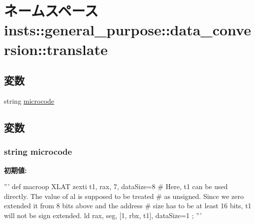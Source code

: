 \hypertarget{namespaceinsts_1_1general__purpose_1_1data__conversion_1_1translate}{
\section{ネームスペース insts::general\_\-purpose::data\_\-conversion::translate}
\label{namespaceinsts_1_1general__purpose_1_1data__conversion_1_1translate}
}
\subsection*{変数}
\begin{DoxyCompactItemize}
\item 
string \hyperlink{namespaceinsts_1_1general__purpose_1_1data__conversion_1_1translate_a770f11a173e99389a8802f0107ed8f52}{microcode}
\end{DoxyCompactItemize}


\subsection{変数}
\hypertarget{namespaceinsts_1_1general__purpose_1_1data__conversion_1_1translate_a770f11a173e99389a8802f0107ed8f52}{
\subsubsection[{microcode}]{\setlength{\rightskip}{0pt plus 5cm}string {\bf microcode}}}
\label{namespaceinsts_1_1general__purpose_1_1data__conversion_1_1translate_a770f11a173e99389a8802f0107ed8f52}
{\bfseries 初期値:}
\begin{DoxyCode}
'''
def macroop XLAT {
    zexti t1, rax, 7, dataSize=8
    # Here, t1 can be used directly. The value of al is supposed to be treated
    # as unsigned. Since we zero extended it from 8 bits above and the address
    # size has to be at least 16 bits, t1 will not be sign extended.
    ld rax, seg, [1, rbx, t1], dataSize=1
};
'''
\end{DoxyCode}
